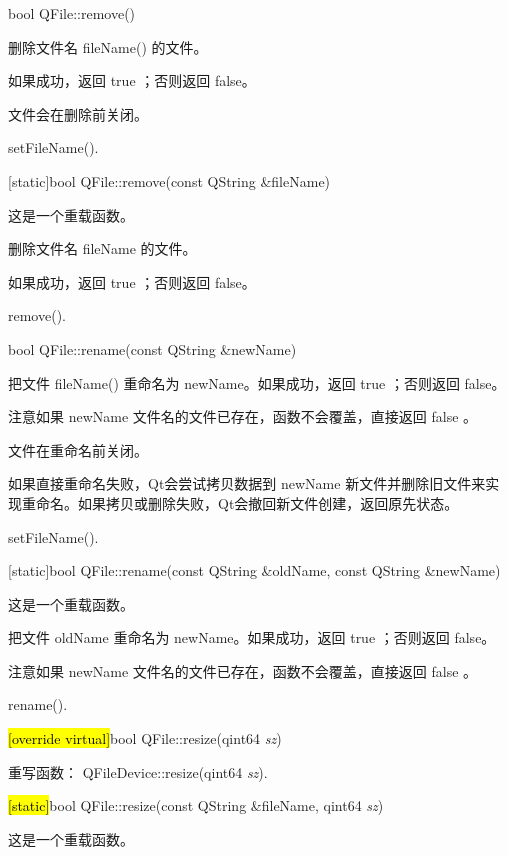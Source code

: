 bool QFile::remove()

删除文件名 fileName() 的文件。

如果成功，返回 true ；否则返回 false。

文件会在删除前关闭。

\begin{notice}[另请参阅]
setFileName().
\end{notice}

[static]bool QFile::remove(const QString \&fileName)

这是一个重载函数。

删除文件名 fileName 的文件。

如果成功，返回 true ；否则返回 false。

\begin{notice}[另请参阅]
remove().
\end{notice}

bool QFile::rename(const QString \&newName)

把文件 fileName() 重命名为 newName。如果成功，返回 true ；否则返回 false。

注意如果 newName 文件名的文件已存在，函数不会覆盖，直接返回 false 。

文件在重命名前关闭。

如果直接重命名失败，Qt会尝试拷贝数据到 newName 新文件并删除旧文件来实现重命名。如果拷贝或删除失败，Qt会撤回新文件创建，返回原先状态。



\begin{notice}[另请参阅]
setFileName().
\end{notice}

[static]bool QFile::rename(const QString \&oldName, const QString \&newName)

这是一个重载函数。

把文件 oldName 重命名为 newName。如果成功，返回 true ；否则返回 false。

注意如果 newName 文件名的文件已存在，函数不会覆盖，直接返回 false 。


\begin{notice}[另请参阅]
rename().
\end{notice}

\hl{[override virtual]}bool QFile::resize(qint64 \emph{sz})

重写函数： QFileDevice::resize(qint64 \emph{sz}).

\hl{[static]}bool QFile::resize(const QString \&fileName, qint64 \emph{sz})

这是一个重载函数。

